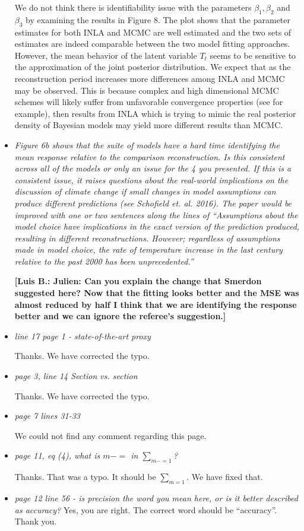 \documentclass[11pt]{article}
\newcommand{\lb}[1]{\color{ForestGreen}\textbf{[Luis B.: #1]}\normalcolor}
\begin{document}
\begin{itemize}
We do not think there is identifiability issue with the parameters
\(\beta_1,\beta_2\) and \(\beta_3\) by examining the results in Figure 8. The plot shows that the parameter estimates for both INLA and MCMC are well estimated and the two sets of estimates are indeed comparable between the two model fitting approaches.
However, the mean behavior of the latent variable
\(T_t\) seems to be sensitive to the approximation of the
joint posterior distribution. We expect that as the reconstruction period increases more differences among INLA and MCMC may be observed. This is because 
 complex and high dimensional MCMC schemes will likely suffer from unfavorable
 convergence properties (see \cite{Rajaratnam2015} for example), then results
 from INLA which is trying to mimic the real posterior density of Bayesian
 models may yield more different results than MCMC.
 
\item \textit{Figure 6b shows that the suite of models have a hard time identifying
    the mean response relative to the comparison reconstruction. Is this
    consistent across all of the models or only an issue for the 4 you
    presented. If this is a consistent issue, it raises questions about the
    real-world implications on the discussion of climate change if small changes
    in model assumptions can produce different predictions (see Schofield et.
    al. 2016). The paper would be improved with one or two sentences along the
    lines of ``Assumptions about the model choice have implications in the exact
    version of the prediction produced, resulting in different reconstructions.
    However; regardless of assumptions made in model choice, the rate of
    temperature increase in the last century relative to the past 2000 has been unprecedented.''}

\lb{Julien: Can you explain the change that Smerdon suggested here? Now that the fitting looks better and the MSE was almost reduced by
  half I think that we are identifying the response better and we can ignore the
referee's suggestion.}  
  
\item \textit{line 17 page 1 - state-of-the-art proxy}

Thanks. We have corrected the typo.
  
\item \textit{page 3, line 14 Section vs. section}

  Thanks. We have corrected the typo.
  
\item \textit{page 7 lines 31-33}

We could not find any comment regarding this page. 

  
\item \textit{page 11, eq (4), what is \(m-=\) in \(\sum_{m-=1}\)?}

  Thanks. That was a typo. It should be \(\sum_{m=1}\). We have fixed that. 
  
\item \textit{page 12 line 56 - is precision the word you mean here, or is it
    better described as accuracy?}
  Yes, you are right. The correct word should be ``accuracy''. Thank you. 
\end{itemize}



\end{document}
